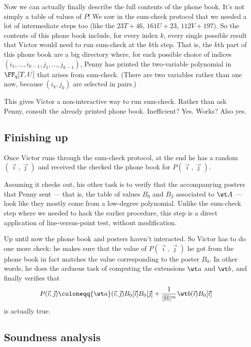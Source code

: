 \documentclass[11pt]{scrreprt}
\newcommand{\HH}{\mathbb H}
\begin{document}
Now we can actually finally describe the full contents of the phone book.
It's not simply a table of values of $P$!
We saw in the sum-check protocol that we needed a lot of intermediate steps too
(like the $23T+46$, $161U+23$, $112V+197$).
So the contents of this phone book include, for every index $k$,
every single possible result that Victor would need to run sum-check at the $k$th step.
That is, the $k$th part of this phone book are a big directory where,
for each possible choice of indices $(i_1, \dots, i_{k-1}, j_1, \dots, j_{k-1})$,
Penny has printed the two-variable polynomial in $\FF_q[T,U]$ that arises from sum-check.
(There are two variables rather than one now,
because $(i_k, j_k)$ are selected in pairs.)

This gives Victor a non-interactive way to run sum-check.
Rather than ask Penny, consult the already printed phone book.
Inefficient? Yes. Works? Also yes.

\subsection{Finishing up}
Once Victor runs through the sum-check protocol,
at the end he has a random $(\vec\imath, \vec\jmath)$ and received
the checked the phone book for $P(\vec\imath, \vec\jmath)$.

Assuming it checks out, his other task is to
verify that the accompanying posters that Penny sent ---
that is, the table of values $B_0$ and $B_2$ associated to $\wt A$ ---
look like they mostly come from a low-degree polynomial.
Unlike the sum-check step where we needed to hack the earlier procedure,
this step is a direct application of line-versus-point test, without modification.

Up until now the phone book and posters haven't interacted.
So Victor has to do one more check:
he makes sure that the value of $P(\vec\imath, \vec\jmath)$ he got from the phone book
in fact matches the value corresponding to the poster $B_0$.
In other words, he does the arduous task of computing the extensions
$\wt a$ and $\wt b$, and finally verifies that
\[
  P(\vec\imath, \vec\jmath) \coloneqq
  {\wt a}(\vec\imath, \vec\jmath) B_0[\vec\imath] B_0[\vec\jmath]
  + \frac{1}{|\HH|^m} \wt b(\vec\imath) B_0[\vec\imath]
\]
is actually true.

\subsection{Soundness analysis}
\end{document}
